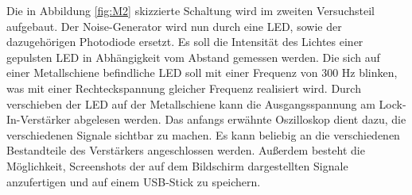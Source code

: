 Die in Abbildung \ref{fig:M2} skizzierte Schaltung wird im zweiten Versuchsteil aufgebaut. Der Noise-Generator wird nun durch eine LED, sowie der dazugehörigen Photodiode ersetzt. Es soll die Intensität des Lichtes einer gepulsten LED in Abhängigkeit vom Abstand gemessen werden.
Die sich auf einer Metallschiene befindliche LED soll mit einer Frequenz von 300 Hz blinken, was mit einer Rechteckspannung gleicher Frequenz realisiert wird. Durch verschieben der LED auf der Metallschiene kann die Ausgangsspannung am Lock-In-Verstärker abgelesen werden.
Das anfangs erwähnte Oszilloskop dient dazu, die verschiedenen Signale sichtbar zu machen. Es kann beliebig an die verschiedenen Bestandteile des Verstärkers angeschlossen werden. Außerdem besteht die Möglichkeit, Screenshots der auf dem Bildschirm dargestellten Signale anzufertigen und auf einem USB-Stick zu speichern.
